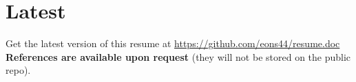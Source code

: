 \documentclass[letterpaper]{twentysecondcv} %
\begin{document}


\section{Latest}

Get the latest version of this resume at \href{https://github.com/eons44/resume.doc}{https://github.com/eons44/resume.doc}\\
\textbf{References are available upon request} (they will not be stored on the public repo).
\end{document}
